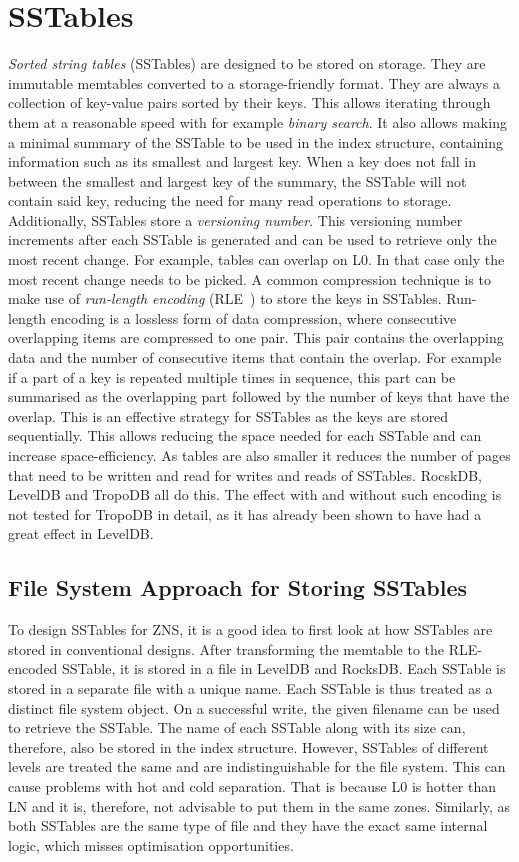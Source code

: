 \section{SSTables}
\label{sec:sstable}
\textit{Sorted string tables} (SSTables) are designed to be stored on storage. They are immutable memtables converted to a storage-friendly format. They are always a collection of key-value pairs sorted by their keys. This allows iterating through them at a reasonable speed with for example \textit{binary search}. It also allows making a minimal summary of the SSTable to be used in the index structure, containing information such as its smallest and largest key. When a key does not fall in between the smallest and largest key of the summary, the SSTable will not contain said key, reducing the need for many read operations to storage. Additionally, SSTables store a \textit{versioning number}. This versioning number increments after each SSTable is generated and can be used to retrieve only the most recent change. For example, tables can overlap on L0. In that case only the most recent change needs to be picked. A common compression technique is to make use of \textit{run-length encoding} (RLE~\cite{robinson1967results}) to store the keys in SSTables. Run-length encoding is a lossless form of data compression, where consecutive overlapping items are compressed to one pair. This pair contains the overlapping data and the number of consecutive items that contain the overlap. For example if a part of a key is repeated multiple times in sequence, this part can be summarised as the overlapping part followed by the number of keys that have the overlap.  This is an effective strategy for SSTables as the keys are stored sequentially. This allows reducing the space needed for each SSTable and can increase space-efficiency. As tables are also smaller it reduces the number of pages that need to be written and read for writes and reads of SSTables. RocskDB, LevelDB and TropoDB all do this. The effect with and without such encoding is not tested for TropoDB in detail, as it has already been shown to have had a great effect in LevelDB.

\subsection{File System Approach for Storing SSTables}
To design SSTables for ZNS, it is a good idea to first look at how SSTables are stored in conventional designs. After transforming the memtable to the RLE-encoded SSTable, it is stored in a file in LevelDB and RocksDB. Each SSTable is stored in a separate file with a unique name. Each SSTable is thus treated as a distinct file system object. On a successful write, the given filename can be used to retrieve the SSTable. The name of each SSTable along with its size can, therefore, also be stored in the index structure. However, SSTables of different levels are treated the same and are indistinguishable for the file system. This can cause problems with hot and cold separation. That is because L0 is hotter than LN and it is, therefore, not advisable to put them in the same zones. Similarly, as both SSTables are the same type of file and they have the exact same internal logic, which misses optimisation opportunities.   

